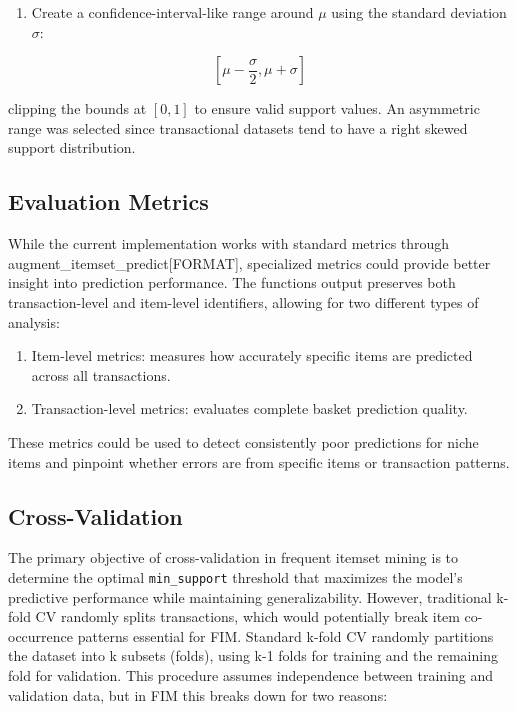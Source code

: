 \documentclass[
  article]{jss}
\providecommand{\tightlist}{%
  \setlength{\itemsep}{0pt}\setlength{\parskip}{0pt}}\usepackage{longtable,booktabs,array}
\begin{document}
\begin{enumerate}
\def\labelenumi{\arabic{enumi}.}
\setcounter{enumi}{1}
\tightlist
\item
  Create a confidence-interval-like range around \(\mu\) using the
  standard deviation \(\sigma\):
\end{enumerate}

\[
[\mu - \frac{\sigma}{2}, \mu + \sigma]
\]

clipping the bounds at \([0, 1]\) to ensure valid support values. An
asymmetric range was selected since transactional datasets tend to have
a right skewed support distribution.

\subsection{Evaluation Metrics}\label{evaluation-metrics}

While the current implementation works with standard metrics through
augment\_itemset\_predict{[}FORMAT{]}, specialized metrics could provide
better insight into prediction performance. The functions output
preserves both transaction-level and item-level identifiers, allowing
for two different types of analysis:

\begin{enumerate}
\def\labelenumi{\arabic{enumi}.}
\item
  Item-level metrics: measures how accurately specific items are
  predicted across all transactions.
\item
  Transaction-level metrics: evaluates complete basket prediction
  quality.
\end{enumerate}

These metrics could be used to detect consistently poor predictions for
niche items and pinpoint whether errors are from specific items or
transaction patterns.

\subsection{Cross-Validation}\label{cross-validation}

The primary objective of cross-validation in frequent itemset mining is
to determine the optimal \texttt{min\_support} threshold that maximizes
the model's predictive performance while maintaining generalizability.
However, traditional k-fold CV randomly splits transactions, which would
potentially break item co-occurrence patterns essential for FIM.
Standard k-fold CV randomly partitions the dataset into k subsets
(folds), using k-1 folds for training and the remaining fold for
validation. This procedure assumes independence between training and
validation data, but in FIM this breaks down for two reasons:
\end{document}
